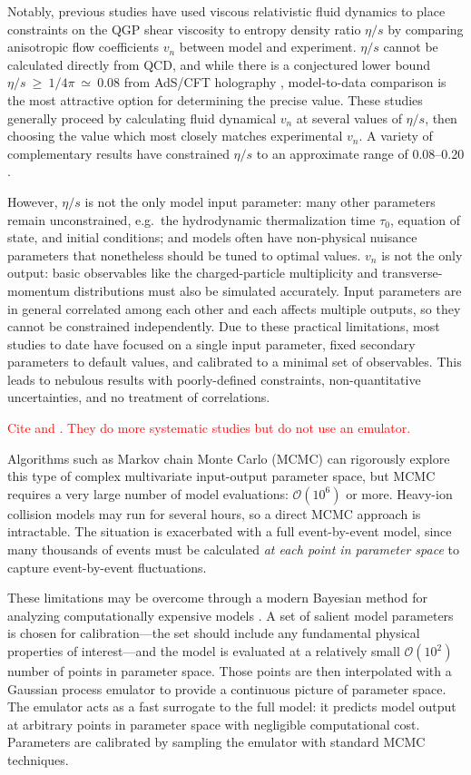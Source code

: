 \documentclass[aps,prc,reprint,amsmath]{revtex4-1}
\newcommand{\todo}[1]{\textcolor{red}{#1}}
\begin{document}
Notably, previous studies have used viscous relativistic fluid dynamics to place constraints on the QGP shear viscosity to entropy density ratio $\eta/s$ by comparing anisotropic flow coefficients $v_n$ between model and experiment.
$\eta/s$ cannot be calculated directly from QCD, and while there is a conjectured lower bound $\eta/s~\geq~1/4\pi~\simeq~0.08$ from AdS/CFT holography \cite{Kovtun:2004de}, model-to-data comparison is the most attractive option for determining the precise value.
These studies generally proceed by calculating fluid dynamical $v_n$ at several values of $\eta/s$, then choosing the value which most closely matches experimental $v_n$.
A variety of complementary results have constrained $\eta/s$ to an approximate range of 0.08--0.20 \cite{Luzum:2008cw,Song:2010mg,Schenke:2010rr}.

However, $\eta/s$ is not the only model input parameter:
many other parameters remain unconstrained, e.g.~the hydrodynamic thermalization time $\tau_0$, equation of state, and initial conditions; and models often have non-physical nuisance parameters that nonetheless should be tuned to optimal values.
$v_n$ is not the only output:
basic observables like the charged-particle multiplicity and transverse-momentum distributions must also be simulated accurately.
Input parameters are in general correlated among each other and each affects multiple outputs, so they cannot be constrained independently.
Due to these practical limitations, most studies to date have focused on a single input parameter, fixed secondary parameters to default values, and calibrated to a minimal set of observables.
This leads to nebulous results with poorly-defined constraints, non-quantitative uncertainties, and no treatment of correlations.

\todo{
  Cite \cite{Luzum:2012wu} and \cite{Soltz:2012rk}.
  They do more systematic studies but do not use an emulator.
}

Algorithms such as Markov chain Monte Carlo (MCMC) can rigorously explore this type of complex multivariate input-output parameter space, but MCMC requires a very large number of model evaluations: $\mathcal O(10^6)$ or more.
Heavy-ion collision models may run for several hours, so a direct MCMC approach is intractable.
The situation is exacerbated with a full event-by-event model, since many thousands of events must be calculated \emph{at each point in parameter space} to capture event-by-event fluctuations.

These limitations may be overcome through a modern Bayesian method for analyzing computationally expensive models \cite{OHagan:2006ba,Higdon:2008cmc,Higdon:2014tva}.
A set of salient model parameters is chosen for calibration---the set should include any fundamental physical properties of interest---and the model is evaluated at a relatively small $\mathcal O(10^2)$ number of points in parameter space.
Those points are then interpolated with a Gaussian process emulator \cite{Rasmussen:2006gp} to provide a continuous picture of parameter space.
The emulator acts as a fast surrogate to the full model:
it predicts model output at arbitrary points in parameter space with negligible computational cost.
Parameters are calibrated by sampling the emulator with standard MCMC techniques.
\end{document}
